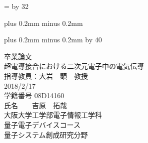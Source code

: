 \documentclass[a4paper,10pt,onecolumn,oneside,openany]{jsbook}
\def\linesparpage#1{\baselineskip=\textheight
   \divide\baselineskip by #1}
\def\kcharparline#1{
   \ifx\xkanjiskip\undefined

   \jintercharskip 0mm plus 0.2mm minus 0.2mm
   \else

   \xkanjiskip 0mm plus 0.2mm minus 0.2mm
   \fi
   \settowidth{\textwidth}{あ}
   \multiply\textwidth by #1}
\begin{document}
\linesparpage{32}
\kcharparline{40}


\begin{titlepage}
\begin{center}
{\huge 卒業論文 \\ }
\vspace*{150truept}
{\huge 超電導接合における二次元電子中の電気伝導}\\
\vspace{100truept}
{\large 指導教員：大岩　顕　教授 \\ }
\vspace{30truept}
{\large 2018/2/17}\\%
{\large 学籍番号 \hspace{15pt} 08D14160}\\
{\large 氏名　\hspace{15pt}　吉原　拓哉}\\
\vspace{100truept}
{\huge 大阪大学工学部電子情報工学科}\\
{\huge 量子電子デバイスコース}\\
{\huge 量子システム創成研究分野}\\
\end{center}
\end{titlepage}

\tableofcontents
\mainmatter

\makeatletter
\newcommand{\figcaption}[1]{\def\@captype{figure}\caption{#1}}
\newcommand{\tblcaption}[1]{\def\@captype{table}\caption{#1}}
\makeatother


%  


\appendix

\newpage
\printindex
\end{document}
